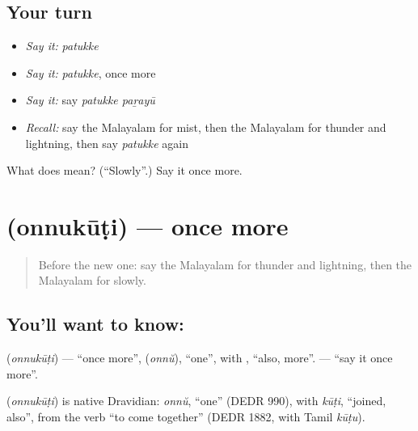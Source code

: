 \subsection*{Your turn}
\begin{itemize}
\raggedright
  \item \emph{Say it:} \emph{patukke}
  \item \emph{Say it:} \emph{patukke}, once more
  \item \emph{Say it:} say \emph{patukke paṟayū}
  \item \emph{Recall:} say the Malayalam for mist, then the Malayalam for thunder and lightning, then say \emph{patukke} again
\end{itemize}

\begin{tcolorbox}[breakable,colback=teal!4,colframe=teal!35!black,title={Before you move on}]
What does  mean? (\textquotedblleft{}Slowly\textquotedblright{}.) Say it once more.
\end{tcolorbox}
\section[\texorpdfstring{\ml{ഒന്നുകൂടി} (onnukūṭi)}{ഒന്നുകൂടി (onnukūṭi)}]{ (onnukūṭi) — once more}

\label{lesson:ML-C119-oncemore}



\begin{quote}
Before the new one: say the Malayalam for thunder and lightning, then the Malayalam for slowly.
\end{quote}

\subsection*{You'll want to know: }
\textbf{} (\emph{onnukūṭi}) — \textquotedblleft{}once more\textquotedblright{}, \textbf{} (\emph{onnŭ}), \textquotedblleft{}one\textquotedblright{}, with \textbf{}, \textquotedblleft{}also, more\textquotedblright{}. \textbf{ } — \textquotedblleft{}say it once more\textquotedblright{}.

\begin{cousinweb}
\textbf{} (\emph{onnukūṭi}) is native Dravidian: \emph{onnŭ}, \textquotedblleft{}one\textquotedblright{} (DEDR 990), with \emph{kūṭi}, \textquotedblleft{}joined, also\textquotedblright{}, from the verb \textquotedblleft{}to come together\textquotedblright{} (DEDR 1882, with Tamil \emph{kūṭu}).
\end{cousinweb}

